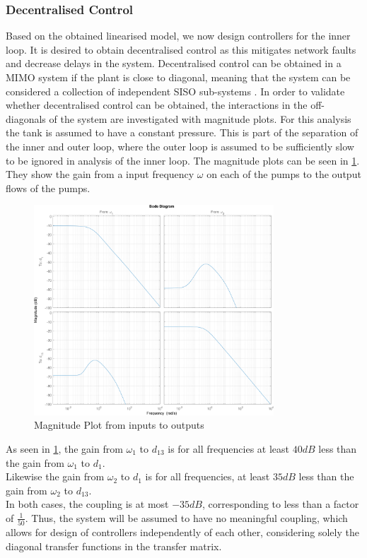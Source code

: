 \subsubsection{Decentralised Control}
Based on the obtained linearised model, we now design controllers for the inner loop. It is desired to obtain decentralised control as this mitigates network faults and decrease delays in the system. Decentralised control can be obtained in a MIMO system if the plant is close to diagonal, meaning that the system can be considered a collection of independent SISO sub-systems \cite[p. 91]{Skogestad2005}. 
In order to validate whether decentralised control can be obtained, the interactions in the off-diagonals of the system are investigated with magnitude plots. For this analysis the tank is assumed to have a constant pressure. This is part of the separation of the inner and outer loop, where the outer loop is assumed to be sufficiently slow to be ignored in analysis of the inner loop. The magnitude plots can be seen in \cref{fig:PumpMagPlot}. They show the gain from a input frequency $\omega$ on each of the pumps to the output flows of the pumps.

\begin{figure}[h!]
	\centering
		\includegraphics[width=0.8\textwidth]{Pictures/PumpMagPlot.png}
		
		\caption{Magnitude Plot from inputs to outputs}
	\label{fig:PumpMagPlot}
\end{figure}

As seen in \cref{fig:PumpMagPlot}, the gain from $\omega_1$ to $d_{13}$ is for all frequencies at least $40 \si{dB}$ less than the gain from $\omega_1$ to $d_1$. \\
Likewise the gain from $\omega_2$ to $d_1$ is for all frequencies, at least $35 \si{dB}$ less than the gain from $\omega_2$ to $d_{13}$.\\
In both cases, the coupling is at most $-35 \si{dB}$, corresponding to less than a factor of $\frac{1}{50}$. Thus, the system will be assumed to have no meaningful coupling, which allows for design of controllers independently of each other, considering solely the diagonal transfer functions in the transfer matrix.

